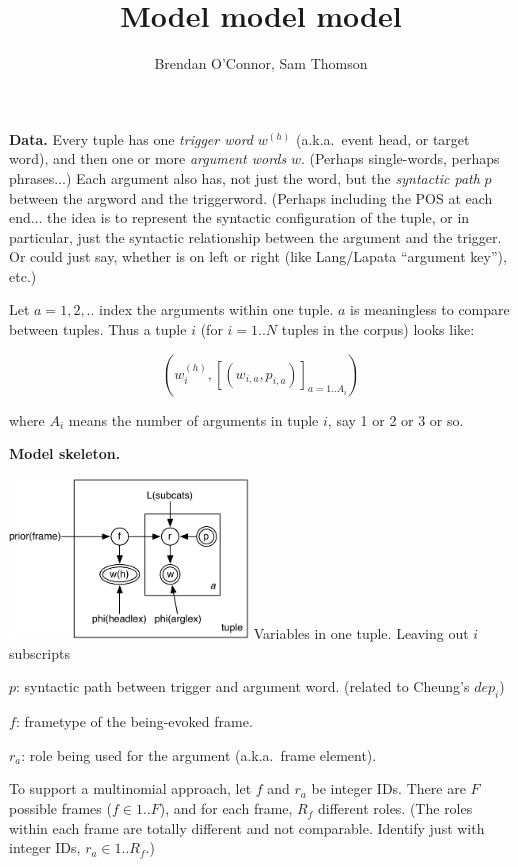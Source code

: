 \documentclass[11pt,letterpaper]{article}
\title{
  Model model model
}
\author{
Brendan O'Connor, Sam Thomson
}
\newenvironment{itemizesquish}{\begin{list}{\labelitemi}{\setlength{\itemsep}{0em}\setlength{\labelwidth}{0.5em}\setlength{\leftmargin}{\labelwidth}\addtolength{\leftmargin}{\labelsep}}}{\end{list}}
\begin{document}
\maketitle

\textbf{Data.} Every tuple has one \emph{trigger word} $w^{(h)}$ (a.k.a.~event head, or target word), and then one or more \emph{argument words} $w$.  (Perhaps single-words, perhaps phrases...)  Each argument also has, not just the word, but the \emph{syntactic path} $p$ between the argword and the triggerword.  (Perhaps including the POS at each end... the idea is to represent the syntactic configuration of the tuple, or in particular, just the syntactic relationship between the argument and the trigger.  Or could just say, whether is on left or right (like Lang/Lapata ``argument key''), etc.)

Let $a=1,2,..$ index the arguments within one tuple.  $a$ is meaningless to compare between tuples.  Thus a tuple $i$ (for $i=1..N$ tuples in the corpus) looks like:

\[ (w^{(h)}_i, [(w_{i,a}, p_{i,a})]_{a=1..A_i}) \]

where $A_i$ means the number of arguments in tuple $i$, say 1 or 2 or 3 or so.

\textbf{Model skeleton.}

\includegraphics[width=2.5in]{diagram}
Variables in one tuple.  Leaving out $i$ subscripts

\begin{itemizesquish}
  \item $p$: syntactic path between trigger and argument word.  (related to Cheung's $dep_i$)
  \item $f$: frametype of the being-evoked frame.
  \item $r_a$: role being used for the argument (a.k.a.~frame element).
\end{itemizesquish}

To support a multinomial approach, let $f$ and $r_a$ be integer IDs.
There are $F$ possible frames ($f \in 1..F$), and for each frame, $R_f$ different roles.  (The roles within each frame are totally different and not comparable.  Identify just with integer IDs, $r_a \in 1..R_f$.)
\end{document}
